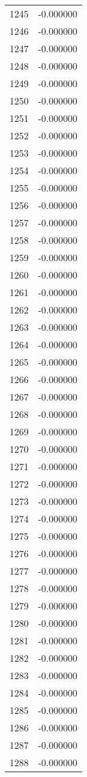 \documentclass[12pt]{article}
\begin{document}
\begin{longtable}{@{}cc@{}}
1245 & -0.000000 \\
1246 & -0.000000 \\
1247 & -0.000000 \\
1248 & -0.000000 \\
1249 & -0.000000 \\
1250 & -0.000000 \\
1251 & -0.000000 \\
1252 & -0.000000 \\
1253 & -0.000000 \\
1254 & -0.000000 \\
1255 & -0.000000 \\
1256 & -0.000000 \\
1257 & -0.000000 \\
1258 & -0.000000 \\
1259 & -0.000000 \\
1260 & -0.000000 \\
1261 & -0.000000 \\
1262 & -0.000000 \\
1263 & -0.000000 \\
1264 & -0.000000 \\
1265 & -0.000000 \\
1266 & -0.000000 \\
1267 & -0.000000 \\
1268 & -0.000000 \\
1269 & -0.000000 \\
1270 & -0.000000 \\
1271 & -0.000000 \\
1272 & -0.000000 \\
1273 & -0.000000 \\
1274 & -0.000000 \\
1275 & -0.000000 \\
1276 & -0.000000 \\
1277 & -0.000000 \\
1278 & -0.000000 \\
1279 & -0.000000 \\
1280 & -0.000000 \\
1281 & -0.000000 \\
1282 & -0.000000 \\
1283 & -0.000000 \\
1284 & -0.000000 \\
1285 & -0.000000 \\
1286 & -0.000000 \\
1287 & -0.000000 \\
1288 & -0.000000 \\

\end{longtable}
\end{document}
